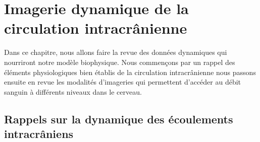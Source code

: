 
\chapter{Imagerie dynamique de la circulation intracrânienne}
	\minitoc



Dans ce chapitre, nous allons faire la revue des données dynamiques qui nourriront notre modèle
biophysique. Nous commençons par un rappel des éléments physiologiques bien établis de la
circulation intracrânienne nous passons ensuite en revue les modalités d’imageries qui permettent
d’accéder au débit sanguin à différents niveaux dans le cerveau.
\section{Rappels sur la dynamique des écoulements intracrâniens}
